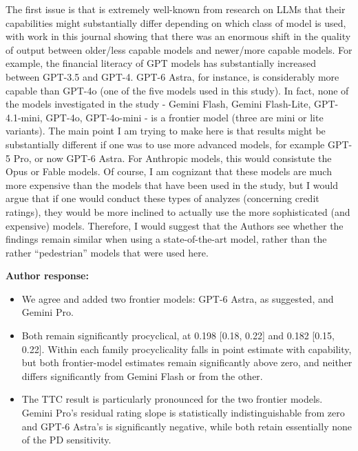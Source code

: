 \documentclass[11pt]{article}
\newcommand{\rvcomment}[1]{{\color{ReviewerGreen}#1}}
\begin{document}
\rvcomment{The first issue is that is extremely well-known from research on LLMs that their capabilities might substantially differ depending on which class of model is used, with work in this journal showing that there was an enormous shift in the quality of output between older/less capable models and newer/more capable models. For example, the financial literacy of GPT models has substantially increased between GPT-3.5 and GPT-4. GPT-6 Astra, for instance, is considerably more capable than GPT-4o (one of the five models used in this study). In fact, none of the models investigated in the study - Gemini Flash, Gemini Flash-Lite, GPT-4.1-mini, GPT-4o, GPT-4o-mini - is a frontier model (three are mini or lite variants). The main point I am trying to make here is that results might be substantially different if one was to use more advanced models, for example GPT-5 Pro, or now GPT-6 Astra. For Anthropic models, this would consistute the Opus or Fable models. Of course, I am cognizant that these models are much more expensive than the models that have been used in the study, but I would argue that if one would conduct these types of analyzes (concerning credit ratings), they would be more inclined to actually use the more sophisticated (and expensive) models. Therefore, I would suggest that the Authors see whether the findings remain similar when using a state-of-the-art model, rather than the rather ``pedestrian'' models that were used here.}

\textbf{Author response:}

\begin{itemize}

\item We agree and added two frontier models: GPT-6 Astra, as suggested, and Gemini Pro.

\item Both remain significantly procyclical, at 0.198 [0.18, 0.22] and 0.182 [0.15, 0.22]. Within each family procyclicality falls in point estimate with capability, but both frontier-model estimates remain significantly above zero, and neither differs significantly from Gemini Flash or from the other.

\item The TTC result is particularly pronounced for the two frontier models. Gemini Pro's residual rating slope is statistically indistinguishable from zero and GPT-6 Astra's is significantly negative, while both retain essentially none of the PD sensitivity.

\end{itemize}
\end{document}
